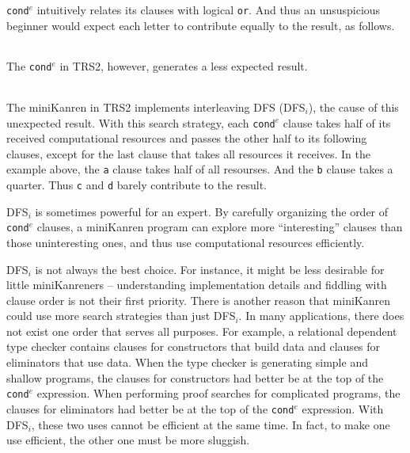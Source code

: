 \documentclass[format=acmlarge, review=true, authordraft=true]{acmart}
\newcommand{\conde}{\texttt{cond$^e$}}
\newcommand{\clisting}[1]{
\begin{center}
  \begin{tabular}{c}
	
    \end{tabular}
\end{center}
}
\newcommand{\DFSi }[0]{DFS$_{i}$}
\begin{document}
\conde{} intuitively relates its clauses with logical \texttt{or}. And thus an 
unsuspicious beginner would expect each letter to contribute equally to the 
result, as follows.

\clisting{Figures/run-repeato-fair.rkt}

The \conde{} in TRS2, however, generates a less expected result.

\clisting{Figures/run-repeato-idfs.rkt}

The miniKanren in TRS2 implements interleaving DFS (\DFSi), the cause of this 
unexpected result. With this search strategy, each \conde{} clause takes half 
of its received computational resources and passes the other half to its 
following clauses, except for the last clause that takes all resources it 
receives. In the example above, the \texttt{a} clause takes half of all 
resourses. And the \texttt{b} clause takes a quarter. Thus \texttt{c} and 
\texttt{d} barely contribute to the result.


\DFSi{} is sometimes powerful for an expert. By carefully organizing the order 
of \conde{} clauses, a miniKanren program can explore more ``interesting'' 
clauses than those uninteresting ones, and thus use computational resources 
efficiently.


\DFSi{} is not always the best choice. For instance, it might be less 
desirable for little miniKanreners -- understanding implementation details and 
fiddling with clause order is not their first priority. 
There is another reason that miniKanren could use more search strategies than
just \DFSi. In many applications, there does not exist one order that serves all
purposes. For example, a relational dependent type checker contains
clauses for constructors that build data and clauses for eliminators that use
data. When the type checker is generating simple and shallow programs,
the clauses for constructors had better be at the top of the
\conde{} expression.
When performing proof searches for complicated programs, the clauses for 
eliminators had better be at the top of the \conde{} expression. With \DFSi, 
these two uses cannot be efficient at the same time. In fact, to make one use 
efficient, the other one must be more sluggish.
\end{document}
